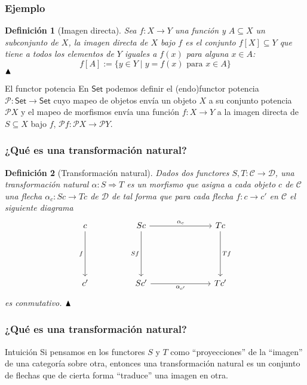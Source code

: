 \documentclass[10pt, aspectratio = 43,usenames,dvipsnames]{beamer}
\newtheorem{definicion}{Definición}
\begin{document}
	\begin{frame}[t]
		\frametitle{Ejemplo}
			\begin{definicion}[Imagen directa]
				Sea $f:X\to Y$ una función y $A\subseteq X$ un subconjunto de $X$, la imagen directa de $X$ bajo $f$ es el conjunto $f[X]\subseteq Y$ que tiene a todos los elementos de $Y$ iguales a $f(x)$ para alguna $x\in A$:
				\begin{equation*}
					f[A] := \{ y \in Y \;|\; y = f(x) \text{ para } x\in A\}
				\end{equation*}
				$\hfill\blacktriangle$
			\end{definicion}
			
			\begin{block}{El functor potencia}
				En $\mathsf{Set}$ podemos definir el (endo)functor potencia $\mathcal{P}:\mathsf{Set}\to\mathsf{Set}$ cuyo mapeo de objetos envía un objeto $X$ a su conjunto potencia $\mathcal{P}X$ y el mapeo de morfismos envía una función $f:X\to Y$ a la imagen directa de $S\subseteq X$ bajo $f$, $\mathcal{P}f:\mathcal{P}X\to\mathcal{P}Y$.
			\end{block}
	\end{frame}
	
	\begin{frame}[t]
		\frametitle{¿Qué es una transformación natural?}
		\begin{definicion}[Transformación natural]
			Dados dos functores $S,T:\mathcal{C}\to\mathcal{D}$, una transformación natural $\alpha:S\Rightarrow T$ es un morfismo que asigna a cada objeto $c$ de $\mathcal{C}$ una flecha $\alpha_{c}: Sc\to Tc$ de $\mathcal{D}$ de tal forma que para cada flecha $f: c\to c'$ en $\mathcal{C}$ el siguiente diagrama 
			\[\begin{tikzcd}[ampersand replacement=\&]
				c \&\& Sc \&\&\& Tc \\
				\\
				\\
				{c'} \&\& {Sc'} \&\&\& {Tc'}
				\arrow["f"', from=1-1, to=4-1]
				\arrow["{\alpha_{c}}", from=1-3, to=1-6]
				\arrow["Sf"', from=1-3, to=4-3]
				\arrow["Tf", from=1-6, to=4-6]
				\arrow["{\alpha_{c'}}"', from=4-3, to=4-6]
			\end{tikzcd}\]
			es conmutativo.
			$\hfill\blacktriangle$
		\end{definicion}
	\end{frame}

	\begin{frame}[t]
		\frametitle{¿Qué es una transformación natural?}
		\begin{block}{Intuición}
			Si pensamos en los functores $S$ y $T$ como ``proyecciones'' de la ``imagen'' de una categoría sobre otra, entonces una transformación natural es un conjunto de flechas que de cierta forma ``traduce'' una imagen en otra.
		\end{block}
	\end{frame}
\end{document}
